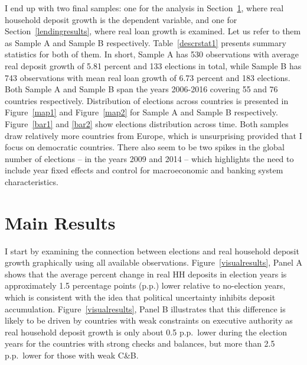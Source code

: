 \documentclass[12pt,a4paper]{article}
\begin{document}
I end up with two final samples: one for the analysis in Section~\ref{mainresults}, where real household deposit growth is the dependent variable, and one for Section~\ref{lendingresults}, where real loan growth is examined. Let us refer to them as Sample A and Sample B respectively. Table~\ref{descrstat1} presents summary statistics for both of them. In short, Sample A has 530 observations with average real deposit growth of 5.81 percent and 133 elections in total, while Sample B has 743 observations with mean real loan growth of 6.73 percent and 183 elections. Both Sample A and Sample B span the years 2006-2016 covering 55 and 76 countries respectively. Distribution of elections across countries is presented in Figure~\ref{map1} and Figure~\ref{map2} for Sample A and Sample B respectively. Figure~\ref{bar1} and \ref{bar2} show elections distribution across time. Both samples draw relatively more countries from Europe, which is unsurprising provided that I focus on democratic countries. There also seem to be two spikes in the global number of elections -- in the years 2009 and 2014 -- which highlights the need to include year fixed effects and control for macroeconomic and banking system characteristics.

\section{Main Results}\label{mainresults}
I start by examining the connection between elections and real household deposit growth graphically using all available observations. Figure~\ref{visualresults}, Panel A shows that the average percent change in real HH deposits in election years is approximately 1.5 percentage points (p.p.) lower relative to no-election years, which is consistent with the idea that political uncertainty inhibits deposit accumulation. Figure~\ref{visualresults}, Panel B illustrates that this difference is likely to be driven by countries with weak constraints on executive authority as real household deposit growth is only about 0.5 p.p.\ lower during the election years for the countries with strong checks and balances, but more than 2.5 p.p.\ lower for those with weak C\&B.
\end{document}
